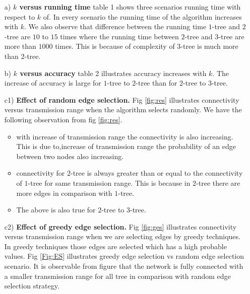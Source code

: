 \documentclass[12pt]{article}
\begin{document}
\begin{itemize}
\item[a)] \textbf{$k$ versus running time} table 1 shows three scenarios running time with respect to $k$ of. In every scenario the running time of the algorithm increases with $k$. We also observe that difference between the running time $1$-tree and $2$-tree are $10$ to $15$ times where the running time between $2$-tree and $3$-tree are more than $1000$ times. This is because of complexity of $3$-tree is much more than $2$-tree.\\
\item [b)]\textbf{$k$ versus accuracy}
table 2 illustrates accuracy increases with $k$. The increase of accuracy is large for $1$-tree to $2$-tree than for $2$-tree to $3$-tree. 

\item [c1)] \textbf{Effect of random edge selection.} Fig \ref{fig:res} illustrates connectivity versus transmission range when the algorithm selects randomly. We have the following observation from fig \ref{fig:res}.

 
\begin{itemize}[noitemsep,nolistsep]
\item with increase of transmission range the connectivity is also increasing. This is due to,increase of transmission range the probability of an edge between two nodes also increasing.
\item connectivity for $2$-tree is always greater than or equal to the connectivity of $1$-tree for same transmission range. This is because in $2$-tree there are more edges in comparison with $1$-tree.
\item The above is also true for $2$-tree to $3$-tree.
\end{itemize}
\item [c2)]\textbf{Effect of greedy edge selection.} Fig \ref{fig:ges} illustrates connectivity versus transmission range when we are selecting edges by greedy techniques. In greedy techniques those edges are selected which has a high probable values. Fig \ref{Fig:ES} illustrates greedy edge selection vs random edge selection scenario.  It is observable from figure that the network is fully connected with a smaller transmission range for all tree in comparison with random edge selection strategy.
\end{itemize}
\end{document}
